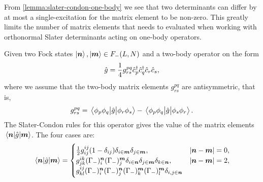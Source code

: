             From \autoref{lemma:slater-condon-one-body} we see that two
            determinants can differ by at most a single-excitation for the
            matrix element to be non-zero.
            This greatly limits the number of matrix elements that needs to
            evaluated when working with orthonormal Slater determinants acting
            on one-body operators.
            \begin{lemma}
                \label{lemma:slater-condon-two-body}
                Given two Fock states $\ket{\boldsymbol{n}}, \ket{\boldsymbol{m}} \in F_{-}(L,
                N)$ and a two-body operator on the form
                \begin{align}
                    \hat{g} = \frac{1}{4}g^{pq}_{rs}\hat{c}_{p}^{\dagger}\hat{c}_{q}^{\dagger}\hat{c}_{r}\hat{c}_{s},
                \end{align}
                where we assume that the two-body matrix elements $g^{pq}_{rs}$
                are antisymmetric, that is,
                \begin{align}
                    g^{pq}_{rs}
                    = \mel{\phi_p\phi_q}{\hat{g}}{\phi_r\phi_s}
                    - \mel{\phi_p\phi_q}{\hat{g}}{\phi_s\phi_r}.
                \end{align}
                The Slater-Condon rules for this operator gives the value of the
                matrix elements $\mel{\boldsymbol{n}}{\hat{g}}{\boldsymbol{m}}$.
                The four cases are:
                \begin{gather}
                    \mel{\boldsymbol{n}}{\hat{g}}{\boldsymbol{m}}
                    = \begin{cases}
                        \frac{1}{2} g^{ij}_{ij}(1 - \delta_{ij})
                        \delta_{i \in \boldsymbol{m}}
                        \delta_{j \in \boldsymbol{m}},
                        & \abs{\boldsymbol{n} - \boldsymbol{m}} = 0,
                        \\
                        g^{ik}_{jk}
                        (\Gamma_{-})^{\boldsymbol{n}}_{i}
                        (\Gamma_{-})^{\boldsymbol{m}}_{j}
                        \delta_{i \in \boldsymbol{n}}
                        \delta_{j \in \boldsymbol{m}}
                        \delta_{k \in \boldsymbol{n}},
                        & \abs{\boldsymbol{n} - \boldsymbol{m}} = 2,
                        \\
                        g^{ij}_{kl}
                        (\Gamma_{-})^{\boldsymbol{n}}_{i}
                        (\Gamma_{-})^{\boldsymbol{n}}_{j}
                        (\Gamma_{-})^{\boldsymbol{m}}_{k}
                        (\Gamma_{-})^{\boldsymbol{m}}_{l}
                        \delta_{i, j \in \boldsymbol{n}}

\end{cases}
\end{gather}
\end{lemma}
